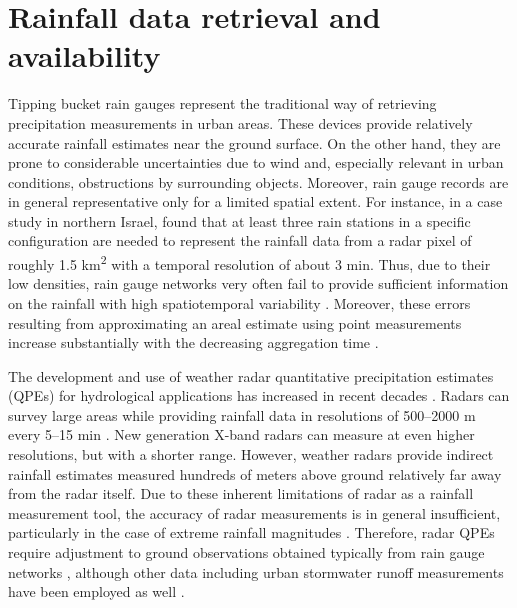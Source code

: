 \documentclass{ctuthesis}\usepackage[]{graphicx}\usepackage[]{color}
\begin{document}
\section{Rainfall data retrieval and availability}

Tipping bucket rain gauges represent the traditional way of retrieving precipitation measurements in urban areas. These devices provide relatively accurate rainfall estimates near the ground surface. On the other hand, they are prone to considerable uncertainties due to wind \citep{nesporEstimationWindInducedError1999} and, especially relevant in urban conditions, obstructions by surrounding objects. Moreover, rain gauge records are in general representative only for a limited spatial extent. For instance, in a case study in northern Israel, \cite{pelegRadarSubpixelscaleRainfall2013} found that at least three rain stations in a specific configuration are needed to represent the rainfall data from a radar pixel of roughly 1.5 km\textsuperscript{2} with a temporal resolution of about 3 min. Thus, due to their low densities, rain gauge networks very often fail to provide sufficient information on the rainfall with high spatiotemporal variability \citep{villariniRainfallSamplingUncertainties2008}. Moreover, these errors resulting from approximating an areal estimate using point measurements increase substantially with the decreasing aggregation time \citep{woodAccuracyRainfallMeasurement2000}.


The development and use of weather radar quantitative precipitation estimates (QPEs) for hydrological applications has increased in recent decades \citep{berneRadarHydrologyUnfulfilled2013, thorndahlWeatherRadarRainfall2017}. Radars can survey large areas while providing rainfall data in resolutions of 500–2000 m every 5–15 min \citep{thorndahlWeatherRadarRainfall2017}. New generation X-band radars \citep[e.g.][]{chenQuantitativePrecipitationEstimation2015, schleissAccuracyWeatherRadar2020} can measure at even higher resolutions, but with a shorter range. However, weather radars provide indirect rainfall estimates measured hundreds of meters above ground relatively far away from the radar itself. Due to these inherent limitations of radar as a rainfall measurement tool, the accuracy of radar measurements is in general insufficient, particularly in the case of extreme rainfall magnitudes \citep{bardossyCombinationRadarDaily2017, thorndahlWeatherRadarRainfall2017}. Therefore, radar QPEs require adjustment to ground observations obtained typically from rain gauge networks \citep{harrisonHighresolutionPrecipitationEstimates2009}, although other data including urban stormwater runoff measurements have been employed as well \citep{ahmWeatherRadarAdjustment2017}.
\end{document}
